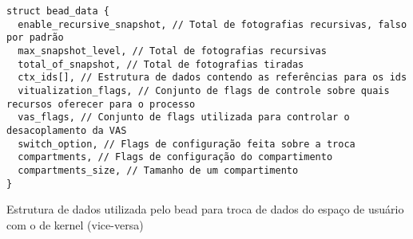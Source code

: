 \begin{pseudocode}

\begin{lstlisting}[language=pseudocode, style=pseudocode]
struct bead_data {
  enable_recursive_snapshot, // Total de fotografias recursivas, falso por padrão
  max_snapshot_level, // Total de fotografias recursivas
  total_of_snapshot, // Total de fotografias tiradas
  ctx_ids[], // Estrutura de dados contendo as referências para os ids
  vitualization_flags, // Conjunto de flags de controle sobre quais recursos oferecer para o processo
  vas_flags, // Conjunto de flags utilizada para controlar o desacoplamento da VAS
  switch_option, // Flags de configuração feita sobre a troca
  compartments, // Flags de configuração do compartimento
  compartments_size, // Tamanho de um compartimento
}

\end{lstlisting}

  \caption{Estrutura de dados utilizada pelo bead para troca de dados do espaço de usuário com o de kernel (vice-versa)}
  \label{alg:beadata}
\end{pseudocode}

